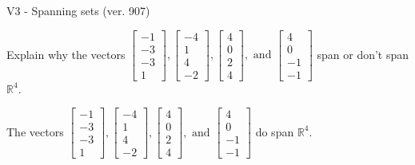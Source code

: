 \begin{exercise}
  \begin{exerciseTitle}V3 - Spanning sets (ver. 907)\end{exerciseTitle}
  \begin{exerciseStatement}
    Explain why the vectors \(\left[\begin{array}{r}
-1 \\
-3 \\
-3 \\
1
\end{array}\right] , \left[\begin{array}{r}
-4 \\
1 \\
4 \\
-2
\end{array}\right] , \left[\begin{array}{r}
4 \\
0 \\
2 \\
4
\end{array}\right] , \text{ and } \left[\begin{array}{r}
4 \\
0 \\
-1 \\
-1
\end{array}\right]\) span or don't span \(\mathbb{R}^4\). 
	


  \end{exerciseStatement}
  \begin{exerciseAnswer}
   The vectors \(\left[\begin{array}{r}
-1 \\
-3 \\
-3 \\
1
\end{array}\right] , \left[\begin{array}{r}
-4 \\
1 \\
4 \\
-2
\end{array}\right] , \left[\begin{array}{r}
4 \\
0 \\
2 \\
4
\end{array}\right] , \text{ and } \left[\begin{array}{r}
4 \\
0 \\
-1 \\
-1
\end{array}\right]\) 
  	 do  
	span \(\mathbb{R}^4\).
  


  \end{exerciseAnswer}
\end{exercise}